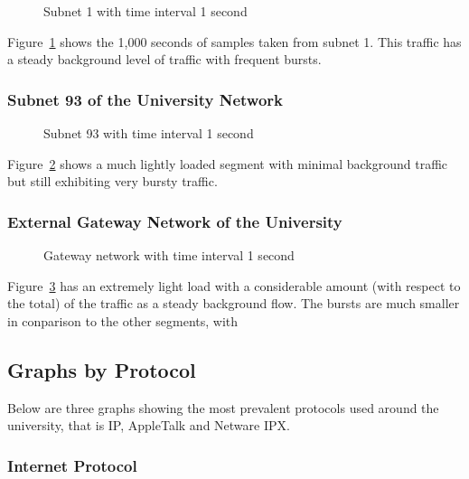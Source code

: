 \begin{figure}
\leavevmode
\epsfysize=3in
\caption{Subnet 1 with time interval 1 second}
\label{simple:snet1.1s.freq}
\end{figure}

Figure~\ref{simple:snet1.1s.freq} shows the 1,000 seconds of samples
taken from subnet 1.  This traffic has a steady background level of
traffic with frequent bursts.

\subsubsection{Subnet 93 of the University Network}

\begin{figure}
\leavevmode
\epsfysize=3in
\caption{Subnet 93 with time interval 1 second}
\label{simple:snet93.1s.freq}
\end{figure}

Figure~\ref{simple:snet93.1s.freq} shows a much lightly loaded segment
with minimal background traffic but still exhibiting very bursty
traffic.

\subsubsection{External Gateway Network of the University}

\begin{figure}
\leavevmode
\epsfysize=3in
\caption{Gateway network with time interval 1 second}
\label{simple:gatew.1s.freq}
\end{figure}

Figure~\ref{simple:gatew.1s.freq} has an extremely light load with a
considerable amount (with respect to the total) of the traffic as a
steady background flow.  The bursts are much smaller in conparison to
the other segments, with 

\subsection{Graphs by Protocol}


Below are three graphs showing the most prevalent protocols used
around the university, that is IP, AppleTalk and Netware IPX.

\subsubsection{Internet Protocol}

